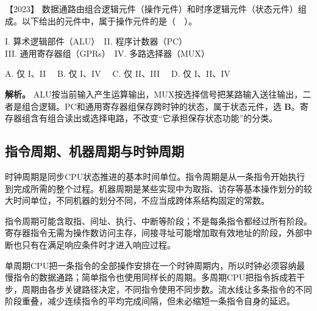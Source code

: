 \noindent{}【2023】 数据通路由组合逻辑元件（操作元件）和时序逻辑元件（状态元件）组成。以下给出的元件中，属于操作元件的是（　）。

I. 算术逻辑部件（ALU）　II. 程序计数器（PC）\\
III. 通用寄存器组（GPRs）　IV. 多路选择器（MUX）

A. 仅 I、II　 B. 仅 I、IV　 C. 仅 II、III　 D. 仅 I、II、IV


\textbf{解析。} ALU按当前输入产生运算输出，MUX按选择信号把某路输入送往输出，二者是组合逻辑。PC和通用寄存器组保存跨时钟的状态，属于状态元件，选 \textbf{B}。寄存器组含有组合读出或选择电路，不改变``它承担保存状态功能''的分类。

\subsection{指令周期、机器周期与时钟周期}\label{co-05-02}

时钟周期是同步CPU状态推进的基本时间单位。指令周期是从一条指令开始执行到完成所需的整个过程。机器周期是某些实现中为取指、访存等基本操作划分的较大时间单位，不同机器的划分不同，不应当成跨体系结构固定的常数。

指令周期可能含取指、间址、执行、中断等阶段；不是每条指令都经过所有阶段。寄存器指令无需为操作数访问主存，间接寻址可能增加取有效地址的阶段，外部中断也只有在满足响应条件时才进入响应过程。

单周期CPU把一条指令的全部操作安排在一个时钟周期内，所以时钟必须容纳最慢指令的数据通路；简单指令也使用同样长的周期。多周期CPU把指令拆成若干步，周期由各步关键路径决定，不同指令使用不同步数。流水线让多条指令的不同阶段重叠，减少连续指令的平均完成间隔，但未必缩短一条指令自身的延迟。

